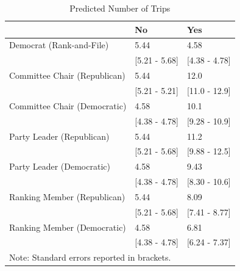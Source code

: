 \documentclass[12pt]{article}                           %
\begin{document}
\begin{table}[h]
\centering
\caption{Predicted Number of Trips}
\label{}
\begin{tabular}{@{}lll@{}}
\toprule
                            & No                 & Yes                 \\ \midrule
Democrat (Rank-and-File)    & 5.44              & 4.58              \\
                            & {[}5.21 - 5.68{]} & {[}4.38 - 4.78{]} \\
Committee Chair (Republican)& 5.44              & 12.0              \\
                            & {[}5.21 - 5.21{]} & {[}11.0 - 12.9{]} \\
Committee Chair (Democratic)& 4.58              & 10.1              \\
                            & {[}4.38 - 4.78{]} & {[}9.28 - 10.9{]} \\
Party Leader (Republican)   & 5.44              & 11.2              \\
                            & {[}5.21 - 5.68{]} & {[}9.88 - 12.5{]} \\
Party Leader (Democratic)   & 4.58              & 9.43              \\
                            & {[}4.38 - 4.78{]} & {[}8.30 - 10.6{]} \\
Ranking Member (Republican) & 5.44              & 8.09              \\
                            & {[}5.21 - 5.68{]} & {[}7.41 - 8.77{]} \\
Ranking Member (Democratic) & 4.58              & 6.81              \\
                            & {[}4.38 - 4.78{]} & {[}6.24 - 7.37{]} \\ \bottomrule
\multicolumn{2}{l}{\footnotesize Note: Standard errors reported in brackets.}    \\
\end{tabular}
\end{table}

\newpage
\clearpage
\end{document}
